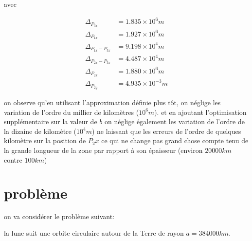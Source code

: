 \documentclass{article} %
\begin{document}
		avec
		
		$$
		\begin{align}
			\Delta_{P_{3x}}&=1.835\times10^6 m \\
			\Delta_{P_{1x}}&=1.927\times10^6 m \\ 
			\Delta_{P_{1x}-P_{3x}}&=9.198\times10^4 m \\ 
			\Delta_{P_{2x}-P_{3x}}&=4.487\times10^4 m \\ 
			\Delta_{P_{2x}}&=1.880\times10^6 m \\
			\Delta_{P_{2y}}&= 4.935\times10^{-3} m
		\end{align}
		$$
		
		on observe qu'en utilisant l'approximation définie plus tôt, on néglige les variation de l'ordre du millier de kilomètres ($10^6 m$). et en ajoutant l'optimisation supplémentaire sur la valeur de $b$ on néglige également les variation de l'ordre de la dizaine de kilomètre ($10^4 m$) ne laissant que les erreurs de l'ordre de quelques kilomètre sur la position de $P_2x$ ce qui ne change pas grand chose compte tenu de la grande longueur de la zone par rapport à son épaisseur (environ $ 20000 km $ contre $100 km$)
		
		
		
		
		
		\section{problème}
		
		on va considérer le problème suivant:
		
		la lune suit une orbite circulaire autour de la Terre de rayon $a=384000km$.
		
\end{document}
